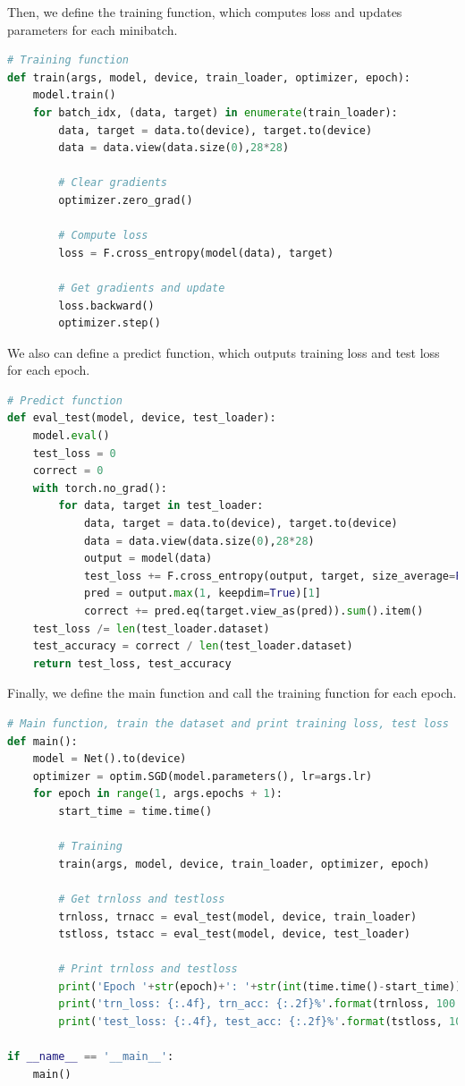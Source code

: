 Then, we define the training function, which computes loss and updates parameters for each minibatch. 

\begin{lstlisting}[language=Python]
# Training function
def train(args, model, device, train_loader, optimizer, epoch):
    model.train()
    for batch_idx, (data, target) in enumerate(train_loader):
        data, target = data.to(device), target.to(device)
        data = data.view(data.size(0),28*28)
        
        # Clear gradients
        optimizer.zero_grad()
        
        # Compute loss
        loss = F.cross_entropy(model(data), target)
        
        # Get gradients and update
        loss.backward()
        optimizer.step()
\end{lstlisting}

We also can define a predict function, which outputs training loss and test loss for each epoch. 

\begin{lstlisting}[language=Python]
# Predict function
def eval_test(model, device, test_loader):
    model.eval()
    test_loss = 0
    correct = 0
    with torch.no_grad():
        for data, target in test_loader:
            data, target = data.to(device), target.to(device)
            data = data.view(data.size(0),28*28)
            output = model(data)
            test_loss += F.cross_entropy(output, target, size_average=False).item()
            pred = output.max(1, keepdim=True)[1]
            correct += pred.eq(target.view_as(pred)).sum().item()
    test_loss /= len(test_loader.dataset)
    test_accuracy = correct / len(test_loader.dataset)
    return test_loss, test_accuracy
\end{lstlisting}

Finally, we define the main function and call the training function for each epoch.

\begin{lstlisting}[language=Python]
# Main function, train the dataset and print training loss, test loss
def main():
    model = Net().to(device)
    optimizer = optim.SGD(model.parameters(), lr=args.lr)
    for epoch in range(1, args.epochs + 1):
        start_time = time.time()
        
        # Training
        train(args, model, device, train_loader, optimizer, epoch)
        
        # Get trnloss and testloss
        trnloss, trnacc = eval_test(model, device, train_loader)
        tstloss, tstacc = eval_test(model, device, test_loader)
        
        # Print trnloss and testloss
        print('Epoch '+str(epoch)+': '+str(int(time.time()-start_time))+'s', end=', ')
        print('trn_loss: {:.4f}, trn_acc: {:.2f}%'.format(trnloss, 100. * trnacc), end=', ')
        print('test_loss: {:.4f}, test_acc: {:.2f}%'.format(tstloss, 100. * tstacc))

if __name__ == '__main__':
    main()
\end{lstlisting}
